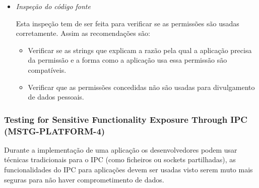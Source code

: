 \begin{itemize}
\item \textit{Inspeção do código fonte}\par
\hfill\par
	Esta inspeção tem de ser feita para verificar se as permissões são usadas corretamente. Assim as recomendações são:\par
	\hfill\par
	\begin{itemize}
		\item Verificar se as strings que explicam a razão pela qual a aplicação precisa da permissão e a forma como a aplicação usa essa permissão são compatíveis.\par
		\hfill\par
		\item Verificar que as permissões concedidas não são usadas para divulgamento de dados pessoais.
	\end{itemize}
\end{itemize}



\subsubsection{Testing for Sensitive Functionality Exposure Through IPC (MSTG-PLATFORM-4)}
\hfill\par
\hfill\par

Durante a implementação de uma aplicação os desenvolvedores podem usar técnicas tradicionais para o IPC (como ficheiros ou sockets partilhadas), as funcionalidades do IPC para aplicações devem ser usadas visto serem muto mais seguras para não haver comprometimento de dados.\par
\hfill\par

